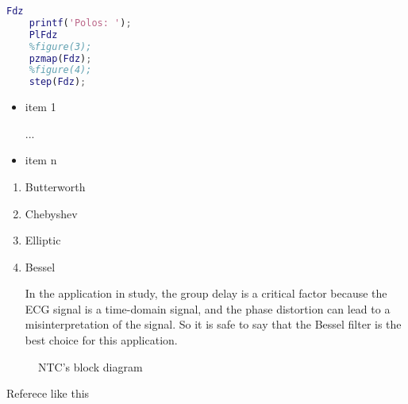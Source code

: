 \begin{lstlisting}[language=Matlab, caption=Matlab code example]
    Fdz
    printf('Polos: ');
    PlFdz
    %figure(3);
    pzmap(Fdz);
    %figure(4);
    step(Fdz);
\end{lstlisting}

\begin{itemize}
    \item item 1
    
    ...
    \item item n 
\end{itemize}

\begin{enumerate}
    \item Butterworth

    \item Chebyshev
    
    \item Elliptic
    
    \item Bessel
    
    In the application in study, the group delay is a critical factor because the ECG signal is a time-domain signal, and the phase distortion can lead to a misinterpretation of the signal. So it is safe to say that the Bessel filter is the best choice for this application.
\end{enumerate}

\begin{figure}[H]   
\begin{centering}
    
    \caption{ NTC's block diagram }
    \label{fig:NTCBlock}

\end{centering}
\end{figure}


Referece like this\textsuperscript{\cite{ESP32-datasheet}}
